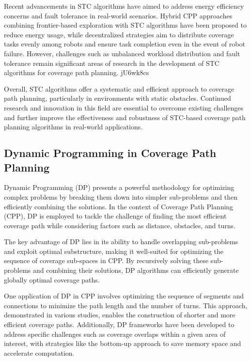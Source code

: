 Recent advancements in STC algorithms have aimed to address energy efficiency concerns and fault tolerance in real-world scenarios. Hybrid CPP approaches combining frontier-based exploration with STC algorithms have been proposed to reduce energy usage, while decentralized strategies aim to distribute coverage tasks evenly among robots and ensure task completion even in the event of robot failure. However, challenges such as unbalanced workload distribution and fault tolerance remain significant areas of research in the development of STC algorithms for coverage path planning.
jU6wk8cs
\vspace*{6mm}

Overall, STC algorithms offer a systematic and efficient approach to coverage path planning, particularly in environments with static obstacles. Continued research and innovation in this field are essential to overcome existing challenges and further improve the effectiveness and robustness of STC-based coverage path planning algorithms in real-world applications.

\subsection{Dynamic Programming in Coverage Path Planning}

Dynamic Programming (DP) presents a powerful methodology for optimizing complex problems by breaking them down into simpler sub-problems and then efficiently combining the solutions. In the context of Coverage Path Planning (CPP), DP is employed to tackle the challenge of finding the most efficient coverage path while considering factors such as distance, obstacles, and turns.

\vspace*{6mm}

The key advantage of DP lies in its ability to handle overlapping sub-problems and exploit optimal substructure, making it well-suited for optimizing the sequence of coverage sub-spaces in CPP. By recursively solving these sub-problems and combining their solutions, DP algorithms can efficiently generate globally optimal coverage paths.

\vspace*{6mm}

One application of DP in CPP involves optimizing the sequence of segments and connections to minimize the path length and the number of turns. This approach, demonstrated in various studies, enables the construction of shorter and more efficient coverage paths. Additionally, DP frameworks have been developed to address specific challenges such as coverage overlaps within a given area of interest, with strategies like the bottom-up approach to save memory space and accelerate computation.

